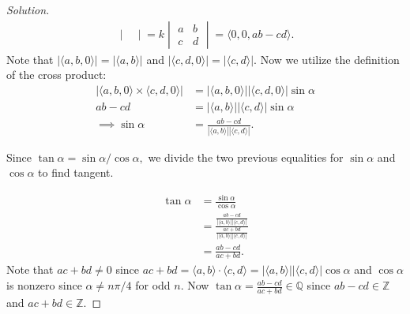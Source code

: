 \documentclass[12pt]{article}
\newcommand{\Z}{\mathbb{Z}}
\newcommand{\Q}{\mathbb{Q}}
\newenvironment{exercise}[2][Exercise]{\begin{trivlist}
        \item[\hskip \labelsep {\bfseries #1}\hskip \labelsep {\bfseries #2.}]}{\end{trivlist}}
\newenvironment{solution}
        {\begin{proof}[Solution]}
                    {\end{proof}}
\begin{document}
\begin{exercise}{6}
\begin{solution}
\begin{align*}
\begin{vmatrix}
            \end{vmatrix} = k\begin{vmatrix}
                a & b\\
                c & d
            \end{vmatrix}= \langle 0,0,ab-cd \rangle.
        \end{align*}
        Note that \( \left| \langle a,b,0 \rangle \right| = \left| \langle a,b \rangle \right| \) and \( \left| \langle c,d,0 \rangle \right| = \left| \langle c,d \rangle \right| . \) Now we utilize the definition of the cross product:
        \begin{align*}
            \left| \langle a,b,0 \rangle \times \langle c,d,0 \rangle \right| &= \left| \langle a,b,0 \rangle \right| \left| \langle c,d,0 \rangle \right| \sin\alpha\\
            ab-cd &= \left| \langle a,b \rangle \right| \left| \langle c,d \rangle \right|\sin\alpha\\
            \implies \sin\alpha &= \frac{ab-cd}{\left| \langle a,b \rangle \right| \left| \langle c,d \rangle \right|}.
        \end{align*}

        Since \( \tan\alpha = \sin\alpha/\cos\alpha, \) we divide the two previous equalities for \( \sin\alpha \) and \( \cos\alpha \) to find tangent.

        \begin{align*}
            \tan\alpha &= \frac{\sin\alpha}{\cos\alpha}\\
            &= \frac{\displaystyle\frac{ab-cd}{\left| \langle a,b \rangle \right| \left| \langle c,d \rangle \right|}}{\displaystyle\frac{ac+bd}{\left| \langle a,b \rangle \right| \left| \langle c,d \rangle \right|}}\\
            &= \frac{ab-cd}{ac+bd}.
        \end{align*}
        Note that \( ac+bd\neq0 \) since \( ac+bd = \langle a,b \rangle \cdot \langle c,d \rangle = \left| \langle a,b \rangle \right| \left| \langle c,d \rangle \right| \cos\alpha\) and \( \cos\alpha \) is nonzero since \( \alpha \neq n\pi/4 \) for odd \( n \). Now \( \tan\alpha = \frac{ab-cd}{ac+bd} \in \Q \) since \( ab-cd \in \Z \) and \( ac+bd \in \Z. \)
    \end{solution}
\end{exercise}
\end{document}
